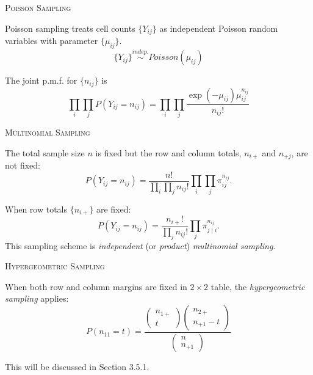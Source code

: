 \documentclass[dvipdfmx, serif,handout]{beamer}
\begin{document}
\begin{frame}{\textsc{Poisson Sampling}}

\bi
\item Poisson sampling treats cell counts $\{Y_{ij}\}$ as independent Poisson random variables with parameter $\{\mu_{ij}\}$.
$$\{Y_{ij}\} \stackrel{indep.}{\sim} Poisson(\mu_{ij})$$
\item The joint p.m.f. for $\{n_{ij}\}$ is
$$\prod_i \prod_jP(Y_{ij}=n_{ij}) = \prod_i \prod_j \frac{\exp(-\mu_{ij})\mu_{ij}^{n_{ij}}}{n_{ij}!}$$
\ei

\end{frame}
\begin{frame}{\textsc{Multinomial Sampling}}

\bi
\item The total sample size $n$ is fixed but the row and column totals, $n_{i+}$ and $n_{+j}$, are not fixed:
{\small
$$P(Y_{ij}=n_{ij}) = \frac{n!}{\prod_i \prod_j n_{ij}!} \prod_i \prod_j \pi_{ij}^{n_{ij}}.$$
}
\item When row totals $\{n_{i+}\}$ are fixed:
{\small
$$P(Y_{ij}=n_{ij}) = \frac{n_{i+}!}{\prod_j n_{ij}!} \prod_j \pi_{j \mid i}^{n_{ij}}.$$
}
This sampling scheme is {\it independent} (or {\it product}) {\it multinomial sampling}.
\ei

\end{frame}
\begin{frame}{\textsc{Hypergeometric Sampling}}

\bi
\item When both row and column margins are fixed in $2\times 2$ table, the {\it hypergeometric sampling} applies:
{\small
$$P(n_{11}=t)=\frac{\left( \begin{array}{c} n_{1+} \\ t \end{array} \right) 
\left( \begin{array}{c} n_{2+} \\ n_{+1}-t \end{array} \right)}{\left( \begin{array}{c} n \\ n_{+1} \end{array} \right)}$$
}
\ei

This will be discussed in Section 3.5.1. 


\end{frame}
\end{document}
